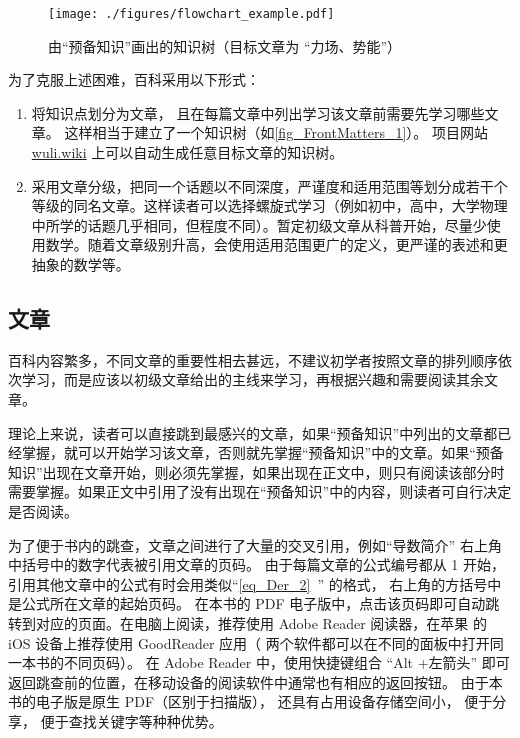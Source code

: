 \begin{figure}[ht]
\centering
\texttt{[image: ./figures/flowchart\_example.pdf]}
\caption{由“预备知识”画出的知识树（目标文章为 “力场、势能”）}\label{fig_FrontMatters_1}
\end{figure}

为了克服上述困难，百科采用以下形式：
\begin{enumerate}
\item 将知识点划分为文章， 且在每篇文章中列出学习该文章前需要先学习哪些文章。 这样相当于建立了一个知识树（如\autoref{fig_FrontMatters_1}）。 项目网站 \href{https://wuli.wiki}{wuli.wiki} 上可以自动生成任意目标文章的知识树。
\item 采用文章分级，把同一个话题以不同深度，严谨度和适用范围等划分成若干个等级的同名文章。这样读者可以选择螺旋式学习（例如初中，高中，大学物理中所学的话题几乎相同，但程度不同）。暂定初级文章从科普开始，尽量少使用数学。随着文章级别升高，会使用适用范围更广的定义，更严谨的表述和更抽象的数学等。
\end{enumerate}

\subsection{文章}
百科内容繁多，不同文章的重要性相去甚远，不建议初学者按照文章的排列顺序依次学习，而是应该以初级文章给出的主线来学习，再根据兴趣和需要阅读其余文章。

理论上来说，读者可以直接跳到最感兴的文章，如果“预备知识”中列出的文章都已经掌握，就可以开始学习该文章，否则就先掌握“预备知识”中的文章。如果“预备知识”出现在文章开始，则必须先掌握，如果出现在正文中，则只有阅读该部分时需要掌握。如果正文中引用了没有出现在“预备知识”中的内容，则读者可自行决定是否阅读。

为了便于书内的跳查，文章之间进行了大量的交叉引用，例如“导数简介” 右上角中括号中的数字代表被引用文章的页码。 由于每篇文章的公式编号都从 1 开始， 引用其他文章中的公式有时会用类似“\autoref{eq_Der_2}~” 的格式， 右上角的方括号中是公式所在文章的起始页码。 在本书的 PDF 电子版中，点击该页码即可自动跳转到对应的页面。在电脑上阅读，推荐使用 Adobe Reader 阅读器，在苹果\textsuperscript{\textregistered} 的 iOS 设备上推荐使用 GoodReader 应用（ 两个软件都可以在不同的面板中打开同一本书的不同页码）。 在 Adobe Reader 中，使用快捷键组合 “Alt +左箭头” 即可返回跳查前的位置，在移动设备的阅读软件中通常也有相应的返回按钮。 由于本书的电子版是原生 PDF（区别于扫描版）， 还具有占用设备存储空间小， 便于分享， 便于查找关键字等种种优势。
